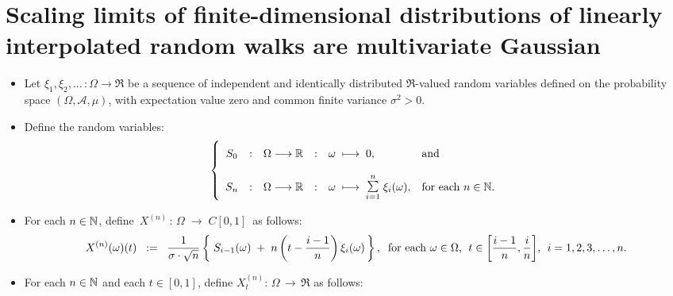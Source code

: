 

\section{Scaling limits of finite-dimensional distributions of linearly interpolated random walks are multivariate Gaussian}
\setcounter{theorem}{0}
\setcounter{equation}{0}

\renewcommand{\theenumi}{\roman{enumi}}
\renewcommand{\labelenumi}{\textnormal{(\theenumi)}$\;\;$}

\begin{proposition}
\mbox{}\vskip 0cm
\begin{itemize}
\item	Let $\xi_{1}, \xi_{2}, \ldots\, : \Omega \longrightarrow \Re$ be a sequence of
		independent and identically distributed $\Re$-valued random variables
		defined on the probability space $(\Omega,\mathcal{A},\mu)$,
		with expectation value zero and common finite variance $\sigma^{2} > 0$.
\item	Define the random variables:
		\begin{equation*}
		\left\{\begin{array}{ccccll}
		S_{0}
		&:&\overset{{\color{white}1}}{\Omega} \longrightarrow \Re
		&:& \omega \;\longmapsto\; 0,
		& \textnormal{and}
		\\ \\
		S_{n}
		&:&	\Omega \longrightarrow \Re
		&:&	\omega \;\longmapsto\; \overset{n}{\underset{i=1}{\textnormal{\Large$\sum$}}}\;\xi_{i}(\omega),
		& \textnormal{for each $n \in \N$}.
		\end{array}\right.
		\end{equation*}
\item	For each $n \in \mathbb{N}$, define \,$X^{(n)} \,:\, \Omega \;\longrightarrow\;C[0,1]$\, as follows:
		\begin{equation*}
		X^{(n)}(\omega)(t)
		\;\; := \;\;
		\dfrac{1}{\sigma\cdot\sqrt{n}}
		\left\{\;
		S_{i-1}(\omega) \;+\; n\left(t - \dfrac{i-1}{n}\right)\xi_{i}(\omega)
		\,\right\},
		\;\;
		\textnormal{for each $\omega \in \Omega$, \;$t \in \left[\frac{i-1}{n},\frac{i}{n}\right]$, \;$i = 1,2,3,\ldots,n$}.
		\end{equation*}
\item	For each $n \in \mathbb{N}$ and each $t \in [0,1]$, define
		\;$X^{(n)}_{t} : \,\Omega \, \longrightarrow \, \Re$\;
		as follows:

\end{itemize}
\end{proposition}
